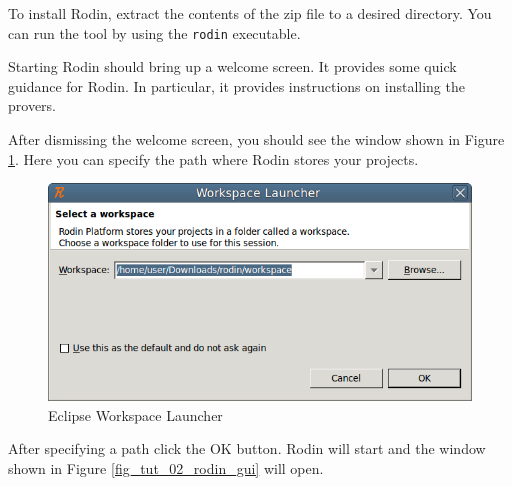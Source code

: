To install Rodin, extract the contents of the zip file to a desired directory. You can run the tool by using the \texttt{rodin} executable.

Starting Rodin should bring up a welcome screen.  It provides some quick guidance for Rodin.  In particular, it provides instructions on installing the provers.


After dismissing the welcome screen, you should see the window shown in Figure \ref{fig_tut_02_workspace_launcher}. Here you can specify the path where Rodin stores your projects.

\begin{figure}[!ht]
\begin{center}
	\includegraphics{img/tutorial/tut_02_install1.png}
	\caption{Eclipse Workspace Launcher}
	\label{fig_tut_02_workspace_launcher}
\end{center}
\end{figure}

After specifying a path click the \textsf{OK} button. Rodin will start and the window shown in Figure \ref{fig_tut_02_rodin_gui} will open.


